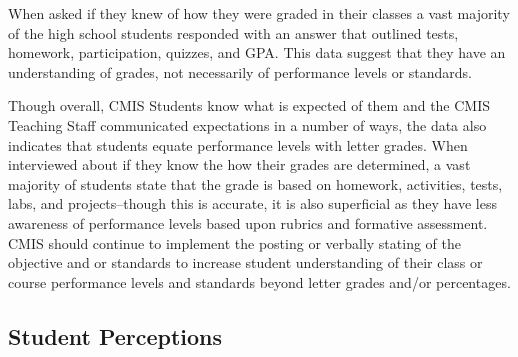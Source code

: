 \documentclass{report}
\begin{document}
\begin{findings}

When asked if they knew of how they were graded in their classes a vast majority of the high school students responded with an answer that outlined tests, homework, participation, quizzes, and GPA. This data suggest that they have an understanding of grades, not necessarily of performance levels or standards. 


Though overall, CMIS Students know what is expected of them and the CMIS Teaching Staff communicated expectations in a number of ways, the data also indicates that students equate performance levels with letter grades. When interviewed about if they know the how their grades are determined, a vast majority of students state that the grade is based on homework, activities, tests, labs, and projects--though this is accurate, it is also superficial as they have less awareness of performance levels based upon rubrics and formative assessment. CMIS should continue to implement the posting or verbally stating of the objective and or standards to increase student understanding of their class or course performance levels and standards beyond letter grades and/or percentages. 
\end{findings}

\subsection{Student Perceptions }


\end{document}
